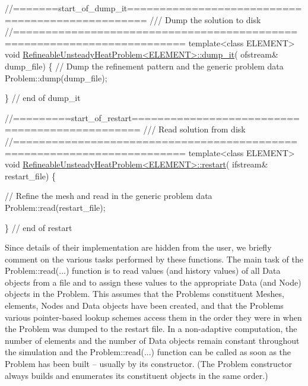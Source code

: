 \begin{DoxyCodeInclude}
\textcolor{comment}{//=======start\_of\_dump\_it=================================================}
\textcolor{comment}{/// Dump the solution to disk}
\textcolor{comment}{}\textcolor{comment}{//========================================================================}
\textcolor{keyword}{template}<\textcolor{keyword}{class} ELEMENT>
\textcolor{keywordtype}{void} \hyperlink{classRefineableUnsteadyHeatProblem_a1fb939c3f9c258fd49328bb1516ced98}{RefineableUnsteadyHeatProblem<ELEMENT>::dump\_it}(
      ofstream& dump\_file)
\{
 \textcolor{comment}{// Dump the refinement pattern and the generic problem data}
 Problem::dump(dump\_file);
  
\} \textcolor{comment}{// end of dump\_it}

\textcolor{comment}{//=========start\_of\_restart===============================================}\textcolor{comment}{}
\textcolor{comment}{/// Read solution from disk}
\textcolor{comment}{}\textcolor{comment}{//========================================================================}
\textcolor{keyword}{template}<\textcolor{keyword}{class} ELEMENT>
\textcolor{keywordtype}{void} \hyperlink{classRefineableUnsteadyHeatProblem_af36fa71e72852367411e21b50b179625}{RefineableUnsteadyHeatProblem<ELEMENT>::restart}(
      ifstream& restart\_file)
\{

 \textcolor{comment}{// Refine the mesh and read in the generic problem data}
 Problem::read(restart\_file);

\} \textcolor{comment}{// end of restart}

\end{DoxyCodeInclude}


Since details of their implementation are hidden from the user, we briefly comment on the various tasks performed by these functions. The main task of the {\ttfamily Problem\+::read}(...) function is to read values (and history values) of all {\ttfamily Data} objects from a file and to assign these values to the appropriate {\ttfamily Data} (and {\ttfamily Node}) objects in the {\ttfamily Problem}. This assumes that the {\ttfamily Problem\textquotesingle{}s} constituent {\ttfamily Meshes}, elements, {\ttfamily Nodes} and {\ttfamily Data} objects have been created, and that the {\ttfamily Problem\textquotesingle{}s} various pointer-\/based lookup schemes access them in the order they were in when the {\ttfamily Problem} was dumped to the restart file. In a non-\/adaptive computation, the number of elements and the number of {\ttfamily Data} objects remain constant throughout the simulation and the {\ttfamily Problem\+::read}(...) function can be called as soon as the {\ttfamily Problem} has been built -- usually by its constructor. (The {\ttfamily Problem} constructor always builds and enumerates its constituent objects in the same order.)

